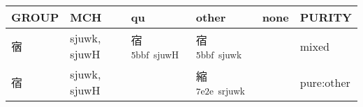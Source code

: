 \documentclass[14pt,a4paper]{scrartcl}
\begin{document}
\begin{longtable}[c]{@{}llllll@{}}
\toprule
\begin{minipage}[b]{0.14\columnwidth}\raggedright\strut
GROUP
\strut\end{minipage} &
\begin{minipage}[b]{0.14\columnwidth}\raggedright\strut
MCH
\strut\end{minipage} &
\begin{minipage}[b]{0.14\columnwidth}\raggedright\strut
qu
\strut\end{minipage} &
\begin{minipage}[b]{0.14\columnwidth}\raggedright\strut
other
\strut\end{minipage} &
\begin{minipage}[b]{0.14\columnwidth}\raggedright\strut
none
\strut\end{minipage} &
\begin{minipage}[b]{0.14\columnwidth}\raggedright\strut
PURITY
\strut\end{minipage}\tabularnewline
\midrule
\endhead
\begin{minipage}[t]{0.14\columnwidth}\raggedright\strut
㝛
\strut\end{minipage} &
\begin{minipage}[t]{0.14\columnwidth}\raggedright\strut
sjuwk, sjuwH
\strut\end{minipage} &
\begin{minipage}[t]{0.14\columnwidth}\raggedright\strut
宿\textsuperscript{5bbf~sjuwH}
\strut\end{minipage} &
\begin{minipage}[t]{0.14\columnwidth}\raggedright\strut
宿\textsuperscript{5bbf~sjuwk}
\strut\end{minipage} &
\begin{minipage}[t]{0.14\columnwidth}\raggedright\strut
\strut\end{minipage} &
\begin{minipage}[t]{0.14\columnwidth}\raggedright\strut
mixed
\strut\end{minipage}\tabularnewline
\begin{minipage}[t]{0.14\columnwidth}\raggedright\strut
宿
\strut\end{minipage} &
\begin{minipage}[t]{0.14\columnwidth}\raggedright\strut
sjuwk, sjuwH
\strut\end{minipage} &
\begin{minipage}[t]{0.14\columnwidth}\raggedright\strut
\strut\end{minipage} &
\begin{minipage}[t]{0.14\columnwidth}\raggedright\strut
縮\textsuperscript{7e2e~srjuwk}
\strut\end{minipage} &
\begin{minipage}[t]{0.14\columnwidth}\raggedright\strut
\strut\end{minipage} &
\begin{minipage}[t]{0.14\columnwidth}\raggedright\strut
pure:other
\strut\end{minipage}\tabularnewline
\bottomrule
\end{longtable}
\end{document}
